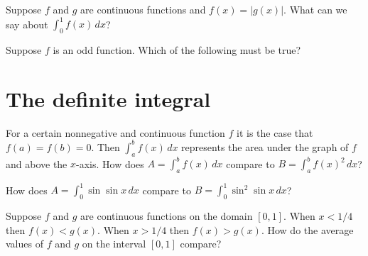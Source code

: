 \documentclass{ximera}
\begin{document}
\begin{problem}
  Suppose $f$ and $g$ are continuous functions and $f(x) = |g(x)|$.  What can we say about $\int_0^1 f(x) \, dx$?
  \begin{multipleChoice}
  \end{multipleChoice}
\end{problem}


\begin{problem}
  Suppose $f$ is an odd function. Which of the following must be true?
  \begin{multipleChoice}
  \end{multipleChoice}
\end{problem}

\clearpage


\section{The definite integral}

\begin{problem}
  For a certain nonnegative and continuous function $f$ it is the case
  that $f(a) = f(b) = 0$.  Then $\int_a^b f(x) \, dx$ represents the
  area under the graph of $f$ and above the $x$-axis.  How does $A = \int_a^b f(x) \, dx$ compare to $B = \int_a^b f(x)^2 \, dx$?
  \begin{multipleChoice}
  \end{multipleChoice}
\end{problem}

\begin{problem}
  How does $A = \int_0^1 \sin \sin x \, dx$ compare to $B = \int_0^1 \sin^2 \sin x \, dx$?
  \begin{multipleChoice}
  \end{multipleChoice}
\end{problem}

\begin{problem}
  Suppose $f$ and $g$ are continuous functions on the domain $[0,1]$.  When $x < 1/4$ then $f(x) < g(x)$.  When $x > 1/4$ then $f(x) > g(x)$.  How do the average values of $f$ and $g$ on the interval $[0,1]$ compare?
  \begin{multipleChoice}
  \end{multipleChoice}
\end{problem}
\end{document}
